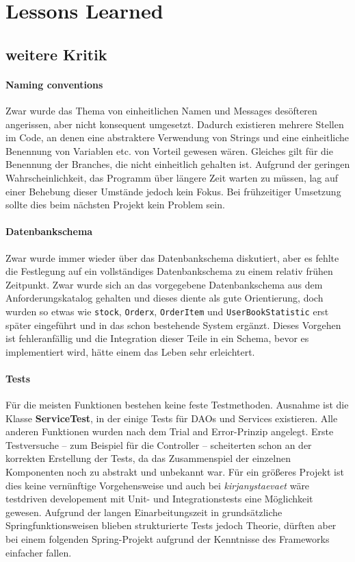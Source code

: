 \section{Lessons Learned}

	\subsection{weitere Kritik}	
		\paragraph{Naming conventions} Zwar wurde das Thema von einheitlichen Namen und Messages desöfteren angerissen, aber nicht konsequent umgesetzt. Dadurch existieren mehrere Stellen im Code, an denen eine abstraktere Verwendung von Strings und eine einheitliche Benennung von Variablen etc. von Vorteil gewesen wären. Gleiches gilt für die Benennung der Branches, die nicht einheitlich gehalten ist. Aufgrund der geringen Wahrscheinlichkeit, das Programm über längere Zeit warten zu müssen, lag auf einer Behebung dieser Umstände jedoch kein Fokus. Bei frühzeitiger Umsetzung sollte dies beim nächsten Projekt kein Problem sein.
		
		\paragraph{Datenbankschema} Zwar wurde immer wieder über das Datenbankschema diskutiert, aber es fehlte die Festlegung auf ein vollständiges Datenbankschema zu einem relativ frühen Zeitpunkt. Zwar wurde sich an das vorgegebene Datenbankschema aus dem Anforderungskatalog gehalten und dieses diente als gute Orientierung, doch wurden so etwas wie \texttt{stock}, \texttt{Orderx}, \texttt{OrderItem} und \texttt{UserBookStatistic} erst später eingeführt und in das schon bestehende System ergänzt. Dieses Vorgehen ist fehleranfällig und die Integration dieser Teile in ein Schema, bevor es implementiert wird, hätte einem das Leben sehr erleichtert.
		
		\paragraph{Tests} Für die meisten Funktionen bestehen keine feste Testmethoden. Ausnahme ist die Klasse \textbf{ServiceTest}, in der einige Tests für DAOs und Services existieren. Alle anderen Funktionen wurden nach dem Trial and Error-Prinzip angelegt. Erste Testversuche -- zum Beispiel für die Controller -- scheiterten schon an der korrekten Erstellung der Tests, da das Zusammenspiel der einzelnen Komponenten noch zu abstrakt und unbekannt war. Für ein größeres Projekt ist dies keine vernünftige Vorgehensweise und auch bei \textit{kirjanystaevaet} wäre testdriven developement mit Unit- und Integrationstests eine Möglichkeit gewesen. Aufgrund der langen Einarbeitungszeit in grundsätzliche Springfunktionsweisen blieben strukturierte Tests jedoch Theorie, dürften aber bei einem folgenden Spring-Projekt aufgrund der Kenntnisse des Frameworks einfacher fallen.

